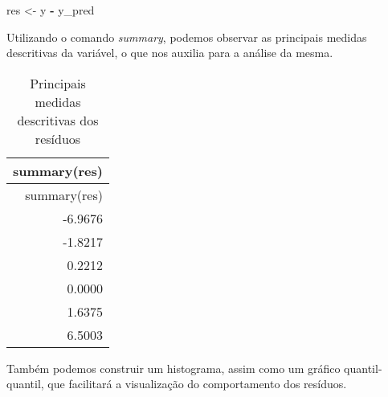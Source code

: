 \documentclass[
]{article}
\newenvironment{Shaded}{\begin{snugshade}}{\end{snugshade}}
\newcommand{\DataTypeTok}[1]{\textcolor[rgb]{0.13,0.29,0.53}{#1}}
\newcommand{\KeywordTok}[1]{\textcolor[rgb]{0.13,0.29,0.53}{\textbf{#1}}}
\newcommand{\NormalTok}[1]{#1}
\newcommand{\OperatorTok}[1]{\textcolor[rgb]{0.81,0.36,0.00}{\textbf{#1}}}
\newcommand{\StringTok}[1]{\textcolor[rgb]{0.31,0.60,0.02}{#1}}
\begin{document}
\begin{Shaded}
\begin{Highlighting}[]
\NormalTok{res <-}\StringTok{ }\NormalTok{y }\OperatorTok{-}\StringTok{ }\NormalTok{y_pred}
\end{Highlighting}
\end{Shaded}

Utilizando o comando \emph{summary}, podemos observar as principais
medidas descritivas da variável, o que nos auxilia para a análise da
mesma.

\begin{Shaded}
\end{Shaded}

\begin{longtable}[]{@{}r@{}}
\caption{Principais medidas descritivas dos resíduos}\tabularnewline
\toprule
summary(res)\tabularnewline
\midrule
\endfirsthead
\toprule
summary(res)\tabularnewline
\midrule
\endhead
-6.9676\tabularnewline
-1.8217\tabularnewline
0.2212\tabularnewline
0.0000\tabularnewline
1.6375\tabularnewline
6.5003\tabularnewline
\bottomrule
\end{longtable}

Também podemos construir um histograma, assim como um gráfico
quantil-quantil, que facilitará a visualização do comportamento dos
resíduos.
\end{document}
